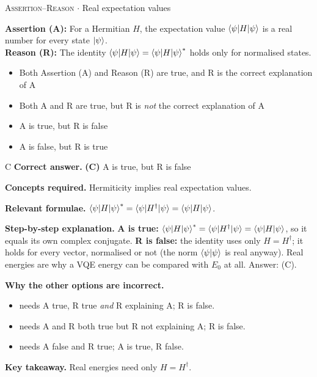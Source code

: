 \documentclass[11pt,a4paper]{article}
\newcommand{\optlabel}[1]{\textbf{(#1)}}
\newcommand{\correctlabel}[1]{\textcolor{okgreen}{\textbf{(#1)}\,\ding{51}}}
\newenvironment{qitem}[1]{\begin{list}{}{\setlength{\leftmargin}{3.3em}\setlength{\labelwidth}{3.1em}%
  \setlength{\labelsep}{0.2em}\setlength{\topsep}{3pt}\setlength{\parsep}{3pt}}\item[\textbf{Q.#1}\hfill]}{\end{list}}
\newcommand{\qsep}{\par\vspace{2pt}{\color{black!15}\hrule}\vspace{4pt}}
\newcommand{\qmeta}[2]{{\footnotesize\color{black!60}\textsc{#1} \;$\cdot$\; #2}\par}
\begin{document}
\begin{qitem}{32}
\qmeta{Assertion--Reason}{Real expectation values}
\textbf{Assertion (A):} For a Hermitian $H$, the expectation value $\braket{\psi|H|\psi}$ is a real number for every state $\ket\psi$.\\[1mm]
\textbf{Reason (R):} The identity $\braket{\psi|H|\psi} = \braket{\psi|H|\psi}^*$ holds only for normalised states.
\begin{itemize}[leftmargin=2.6em, labelsep=0.4em, itemsep=2pt, topsep=3pt]
\item[\optlabel{A}] Both Assertion (A) and Reason (R) are true, and R is the correct explanation of A
\item[\optlabel{B}] Both A and R are true, but R is \emph{not} the correct explanation of A
\item[\correctlabel{C}] A is true, but R is false
\item[\optlabel{D}] A is false, but R is true
\end{itemize}
\end{qitem}
\begin{solbox}{C}
\textbf{\color{brand}Correct answer.} \textcolor{okgreen}{\textbf{(C)}} A is true, but R is false

\textbf{\color{brand}Concepts required.} Hermiticity implies real expectation values.

\textbf{\color{brand}Relevant formulae.} $\braket{\psi|H|\psi}^* = \braket{\psi|H^\dagger|\psi} = \braket{\psi|H|\psi}$.

\textbf{\color{brand}Step-by-step explanation.} \textbf{A is true:} $\braket{\psi|H|\psi}^* = \braket{\psi|H^\dagger|\psi} = \braket{\psi|H|\psi}$, so it equals its own complex conjugate.
\textbf{R is false:} the identity uses only $H = H^\dagger$; it holds for every vector, normalised or not (the norm $\braket{\psi|\psi}$ is real anyway).
Real energies are why a VQE energy can be compared with $E_0$ at all. Answer: (C).

\textbf{\color{brand}Why the other options are incorrect.}
\begin{itemize}[leftmargin=2.4em, itemsep=1pt, topsep=2pt]
\item[\textbf{(A)}] needs A true, R true \emph{and} R explaining A; R is false.
\item[\textbf{(B)}] needs A and R both true but R not explaining A; R is false.
\item[\textbf{(D)}] needs A false and R true; A is true, R false.
\end{itemize}
\textbf{\color{brand}Key takeaway.} Real energies need only $H = H^\dagger$.
\end{solbox}
\qsep
\end{document}
